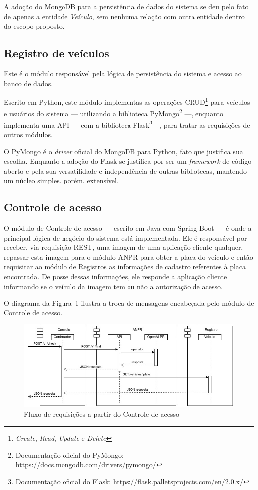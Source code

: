 \documentclass[12pt]{article}
\begin{document}
A adoção do MongoDB para a persistência de dados do sistema se deu pelo fato de apenas a entidade \textit{Veículo}, sem nenhuma relação com outra entidade dentro do escopo proposto.

\subsection{Registro de veículos}

Este é o módulo responsável pela lógica de persistência do sistema e acesso ao banco de dados.

Escrito em Python, este módulo implementas as operações CRUD\footnote{\textit{Create}, \textit{Read}, \textit{Update} e \textit{Delete}} para veículos e usuários do sistema — utilizando a biblioteca PyMongo\footnote{Documentação oficial do PyMongo: \url{https://docs.mongodb.com/drivers/pymongo/}} —, enquanto implementa uma API — com a biblioteca Flask\footnote{Documentação oficial do Flask: \url{https://flask.palletsprojects.com/en/2.0.x/}}—, para tratar as requisições de outros módulos.

O PyMongo é o \textit{driver} oficial do MongoDB para Python, fato que justifica sua escolha. Enquanto a adoção do Flask se justifica por ser um \textit{framework} de código-aberto e pela sua versatilidade e independência de outras bibliotecas, mantendo um núcleo simples, porém, extensível. 

\subsection{Controle de acesso}

O módulo de Controle de acesso — escrito em Java com Spring-Boot — é onde a principal lógica de negócio do sistema está implementada. Ele é responsável por receber, via requisição REST, uma imagem de uma aplicação cliente qualquer, repassar esta imagem para o módulo ANPR para obter a placa do veículo e então requisitar ao módulo de Registros as informações de cadastro referentes à placa encontrada. De posse dessas informações, ele responde a aplicação cliente informando se o veículo da imagem tem ou não a autorização de acesso.

O diagrama da Figura~\ref{fig:check4j} ilustra a troca de mensagens encabeçada pelo módulo de Controle de acesso.

\begin{figure}[ht]
	\centering
	\includegraphics[width=1\textwidth]{check4j.jpg}
	\caption{Fluxo de requisições a partir do Controle de acesso}
	\label{fig:check4j}
\end{figure}
\end{document}
